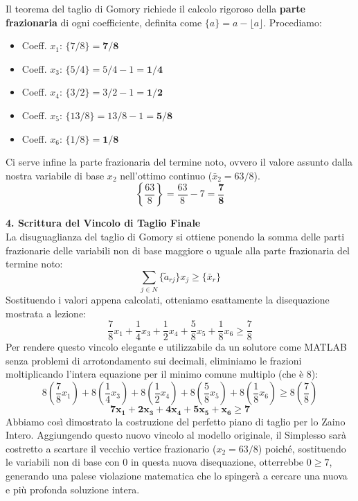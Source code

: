 \documentclass[12pt, a4paper]{article}
\begin{document}
	Il teorema del taglio di Gomory richiede il calcolo rigoroso della \textbf{parte frazionaria} di ogni coefficiente, definita come $\{a\} = a - \lfloor a \rfloor$. Procediamo:
	\begin{itemize}[label=$\circ$, itemsep=2pt, leftmargin=1.5cm]
		\item Coeff. $x_1$: $\{7/8\} = \mathbf{7/8}$
		\item Coeff. $x_3$: $\{5/4\} = 5/4 - 1 = \mathbf{1/4}$
		\item Coeff. $x_4$: $\{3/2\} = 3/2 - 1 = \mathbf{1/2}$
		\item Coeff. $x_5$: $\{13/8\} = 13/8 - 1 = \mathbf{5/8}$
		\item Coeff. $x_6$: $\{1/8\} = \mathbf{1/8}$
	\end{itemize}
	Ci serve infine la parte frazionaria del termine noto, ovvero il valore assunto dalla nostra variabile di base $x_2$ nell'ottimo continuo ($\bar{x}_2 = 63/8$).
	\[
	\left\{\frac{63}{8}\right\} = \frac{63}{8} - 7 = \mathbf{\frac{7}{8}}
	\]
	
	\vspace{0.4cm}
	\textbf{4. Scrittura del Vincolo di Taglio Finale}\\
	La disuguaglianza del taglio di Gomory si ottiene ponendo la somma delle parti frazionarie delle variabili non di base maggiore o uguale alla parte frazionaria del termine noto:
	\[
	\sum_{j \in N} \{\tilde{a}_{rj}\} x_j \geq \{\bar{x}_r\}
	\]
	Sostituendo i valori appena calcolati, otteniamo esattamente la disequazione mostrata a lezione:
	\[
	\frac{7}{8}x_1 + \frac{1}{4}x_3 + \frac{1}{2}x_4 + \frac{5}{8}x_5 + \frac{1}{8}x_6 \geq \frac{7}{8}
	\]
	Per rendere questo vincolo elegante e utilizzabile da un solutore come MATLAB senza problemi di arrotondamento sui decimali, eliminiamo le frazioni moltiplicando l'intera equazione per il minimo comune multiplo (che è $8$):
	\[
	8\left(\frac{7}{8}x_1\right) + 8\left(\frac{1}{4}x_3\right) + 8\left(\frac{1}{2}x_4\right) + 8\left(\frac{5}{8}x_5\right) + 8\left(\frac{1}{8}x_6\right) \geq 8\left(\frac{7}{8}\right)
	\]
	\[
	\mathbf{7x_1 + 2x_3 + 4x_4 + 5x_5 + x_6 \geq 7}
	\]
	Abbiamo così dimostrato la costruzione del perfetto piano di taglio per lo Zaino Intero. Aggiungendo questo nuovo vincolo al modello originale, il Simplesso sarà costretto a scartare il vecchio vertice frazionario ($x_2 = 63/8$) poiché, sostituendo le variabili non di base con $0$ in questa nuova disequazione, otterrebbe $0 \geq 7$, generando una palese violazione matematica che lo spingerà a cercare una nuova e più profonda soluzione intera.
	
\end{document}
